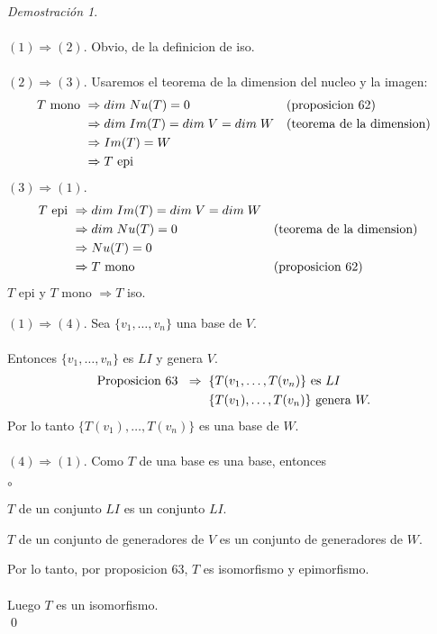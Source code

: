 \documentclass{article}
\theoremstyle{definition}
\theoremstyle{definition}
\theoremstyle{remark}
\newtheorem*{demo}{Demostración}
\begin{document}
\begin{demo}\; \\\\
  $(1) \Rightarrow (2)$. Obvio, de la definicion de iso. \\\\
  $(2) \Rightarrow (3)$. Usaremos el teorema de la dimension del nucleo y la imagen: \begin{align}
    T \text{ mono } & \Rightarrow dim\; Nu(T) = 0 && (\text{proposicion 62}) \notag \\
                    &\Rightarrow dim\; Im(T)=dim \; V = dim\; W && \text{(teorema de la dimension)} \notag \\
                    &\Rightarrow Im(T) = W \notag \\
                    &\Rightarrow T \text{ epi } 
  \end{align}
  $(3)\Rightarrow (1)$. \begin{align}
    T \text{ epi } &\Rightarrow dim \; Im(T)=dim\;V=dim\;W \notag \\
                   &\Rightarrow dim \; Nu(T)=0 && \text{(teorema de la dimension)} \notag \\
                   &\Rightarrow Nu(T)=0 \notag \\
                   &\Rightarrow T \text{ mono } && \text{(proposicion 62)}
  \end{align}
  $T$ epi y $T$ mono $\Rightarrow T$ iso.\pagebreak

  $(1) \Rightarrow (4)$. Sea $\{v_1, \dots ,v_n\}$ una base de $V$. \\\\ Entonces $\{v_1, \dots ,v_n\}$ es $LI$ y genera $V$. \begin{align}
    \text{Proposicion 63 } \; \Rightarrow \; \; &\{T(v_1, \dots ,T(v_n)\} \text{ es } LI \notag \\
                                             &\{T(v_1),\dots ,T(v_n)\} \text{ genera } W. \notag
  \end{align}
  Por lo tanto $\{T(v_1),\dots ,T(v_n)\}$ es una base de $W$. \\\\
  $(4) \Rightarrow (1)$. Como $T$ de una base es una base, entonces \begin{list}{$\circ$}{}  
\item   $T$ de un conjunto $LI$ es un conjunto $LI$. 
\item $T$ de un conjunto de generadores de $V$ es un conjunto de generadores de $W$.
\end{list}
Por lo tanto, por proposicion 63, $T$ es isomorfismo y epimorfismo. \\\\ Luego $T$ es un isomorfismo. \\ \qed
\end{demo}
\end{document}
